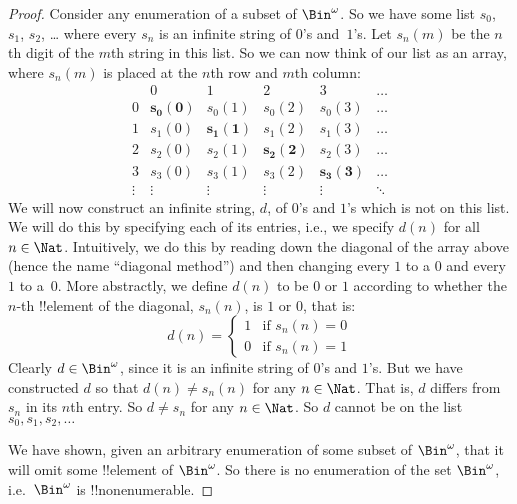 \documentclass[../../../include/open-logic-section]{subfiles}
\begin{document}
\begin{proof}
	Consider any enumeration of a subset of $\Bin^\omega$. So we have some list $s_{0}$, $s_{1}$,
$s_{2}$, \dots{} where every $s_n$ is an infinite string of $0$'s and~$1$'s.
Let $s_n(m)$ be the $n$th digit of the $m$th string in this list. So we can now think of our list as an array, where $s_n(m)$ is placed at the $n$th row and $m$th column:
\[
\begin{array}{c|c|c|c|c|c}
& 0 & 1 & 2 & 3 & \dots \\\hline
0 & \mathbf{s_{0}(0)} & s_{0}(1) & s_{0}(2) & s_0(3) & \dots \\\hline
1 & s_{1}(0)& \mathbf{s_{1}(1)} & s_1(2) & s_1(3) & \dots \\\hline
2 & s_{2}(0)& s_{2}(1) & \mathbf{s_2(2)} & s_2(3) & \dots \\\hline
3 & s_{3}(0)& s_{3}(1) & s_3(2) & \mathbf{s_3(3)} & \dots \\\hline
\vdots & \vdots & \vdots & \vdots & \vdots & \mathbf{\ddots}
\end{array}
\]
We will now construct an infinite string, $d$, of $0$'s and
$1$'s which is not on this list.  We will do this by specifying each of its entries,
i.e., we specify $d(n)$ for all $n \in \Nat$.  Intuitively, we do this
by reading down the diagonal of the array above (hence the name
``diagonal method'') and then changing every $1$ to a $0$ and every
$1$ to a~$0$. More abstractly, we define $d(n)$ to be $0$
or $1$ according to whether the $n$-th !!{element} of the diagonal,
$s_n(n)$, is $1$ or $0$, that is:
\[
d(n) =
\begin{cases}
1 & \text{if $s_{n}(n) = 0$}\\
0 & \text{if $s_{n}(n) = 1$}
\end{cases}
\]
Clearly $d \in \Bin^\omega$, since it is an infinite string of $0$'s and
$1$'s. %
But we have constructed $d$ so that $d(n) \neq s_n(n)$ for any $n \in \Nat$. That is, $d$ differs from $s_n$ in its $n$th entry. So $d \neq s_n$ for any $n\in \Nat$. So $d$ cannot be on the list $s_0, s_1, s_2, \ldots$

We have shown, given an arbitrary enumeration of some subset of $\Bin^\omega$, that it will omit some !!{element} of $\Bin^\omega$. So there is no enumeration of the set $\Bin^\omega$, i.e.\ $\Bin^\omega$ is !!{nonenumerable}.
\end{proof}
\end{document}
